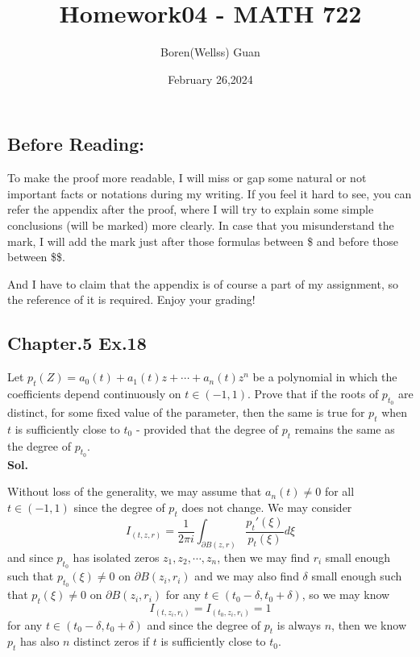 \documentclass[lang=en,11pt,a4paper,citestyle =authoryear]{elegantpaper}
\title{Homework04 - MATH 722}
\author{Boren(Wellss) Guan}
\date{February 26,2024}
\begin{document}
\maketitle

\subsection*{Before Reading:}\par
To make the proof more readable, I will miss or gap some natural or not important facts or notations during my writing. If you feel it hard to see, you can refer the appendix after the proof, where I will try to explain some simple conclusions (will be marked) more clearly. In case that you misunderstand the mark, I will add the mark just after those formulas between \$ and before those between \$\$.\par
And I have to claim that the appendix is of course a part of my assignment, so the reference of it is required. Enjoy your grading!

\subsection*{Chapter.5 Ex.18} 
Let $p_t(Z) = a_0(t)+a_1(t)z+\cdots+a_n(t)z^n$ be a polynomial in which the coefficients depend continuously on $t\in(-1,1)$. Prove that if the roots of $p_{t_0}$ are distinct, for some fixed value of the parameter, then the same is true for $p_t$ when $t$ is sufficiently close to $t_0$ - provided that the degree of $p_t$ remains the same as the degree of $p_{t_0}$.
\vspace{0.5em}\\
\textbf{Sol.} \par
Without loss of the generality, we may assume that $a_n(t)\neq 0$ for all $t\in (-1,1)$ since the degree of $p_t$ does not change. We may consider
\[
I_{(t,z,r)} = \dfrac{1}{2\pi i}\int_{\partial B(z,r)} \dfrac{p_t'(\xi)}{p_t(\xi)}d\xi 
\]
and since $p_{t_0}$ has isolated zeros $z_1,z_2,\cdots,z_n$, then we may find $r_i$ small enough such that $p_{t_0}(\xi) \neq 0$ on $\partial B(z_i,r_i)$ and we may also find $\delta$ small enough such that $p_t(\xi)\neq 0$ on $\partial B(z_i,r_i)$ for any $t\in(t_0-\delta,t_0+\delta)$, so we may know
\[
I_{(t,z_i,r_i)} = I_{(t_0,z_i,r_i)} = 1
\] 
for any $t\in (t_0-\delta,t_0+\delta)$ and since the degree of $p_t$ is always $n$, then we know $p_t$ has also $n$ distinct zeros if $t$ is sufficiently close to $t_0$.
\vspace{0.5em}
\end{document}
